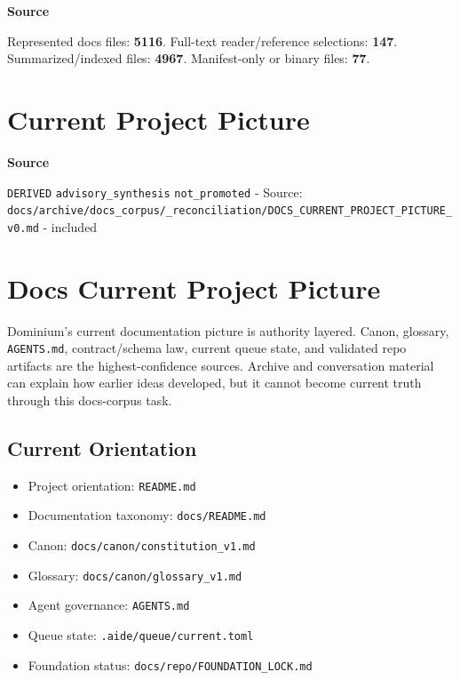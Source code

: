 \documentclass[10.5pt,a4paper,openany]{book}
\newcommand{\vonecallout}[3]{\par\medskip\noindent\begingroup\setlength{\fboxsep}{7pt}\colorbox{DomCalloutBg}{\parbox{0.94\linewidth}{\textbf{\textcolor{#1}{#2}}\par #3}}\endgroup\par\medskip}
\begin{document}
\vonecallout{DomSlate}{Source}{Represented docs files: \textbf{5116}.\allowbreak{} Full-\allowbreak{}text reader/\allowbreak{}reference selections: \textbf{147}.\allowbreak{} Summarized/\allowbreak{}indexed files: \textbf{4967}.\allowbreak{} Manifest-\allowbreak{}only or binary files: \textbf{77}.\allowbreak{}}



\section{Current Project Picture}

\vonecallout{DomSlate}{Source}{\texttt{DERIVED} \texttt{advisory\_\allowbreak{}synthesis} \texttt{not\_\allowbreak{}promoted} -\allowbreak{} Source: \texttt{docs/\allowbreak{}archive/\allowbreak{}docs\_\allowbreak{}corpus/\allowbreak{}\_\allowbreak{}reconciliation/\allowbreak{}DOCS\_\allowbreak{}CURRENT\_\allowbreak{}PROJECT\_\allowbreak{}PICTURE\_\allowbreak{}v0.\allowbreak{}md} -\allowbreak{} included}

\section{Docs Current Project Picture}

Dominium's current documentation picture is authority layered.\allowbreak{} Canon, glossary, \texttt{AGENTS.\allowbreak{}md}, contract/\allowbreak{}schema law, current queue state, and validated repo artifacts are the highest-\allowbreak{}confidence sources.\allowbreak{} Archive and conversation material can explain how earlier ideas developed, but it cannot become current truth through this docs-\allowbreak{}corpus task.\allowbreak{}


\subsection{Current Orientation}

\begin{itemize}
\item Project orientation: \texttt{README.\allowbreak{}md}
\item Documentation taxonomy: \texttt{docs/\allowbreak{}README.\allowbreak{}md}
\item Canon: \texttt{docs/\allowbreak{}canon/\allowbreak{}constitution\_\allowbreak{}v1.\allowbreak{}md}
\item Glossary: \texttt{docs/\allowbreak{}canon/\allowbreak{}glossary\_\allowbreak{}v1.\allowbreak{}md}
\item Agent governance: \texttt{AGENTS.\allowbreak{}md}
\item Queue state: \texttt{.\allowbreak{}aide/\allowbreak{}queue/\allowbreak{}current.\allowbreak{}toml}
\item Foundation status: \texttt{docs/\allowbreak{}repo/\allowbreak{}FOUNDATION\_\allowbreak{}LOCK.\allowbreak{}md}
\end{itemize}
\end{document}
